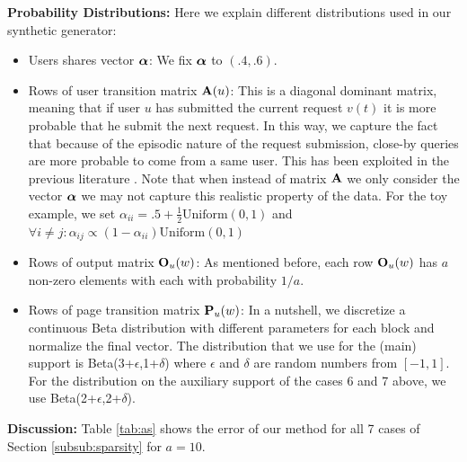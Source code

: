	{\bf Probability Distributions:}
	\label{subsub:dist}
	Here we explain different distributions used in our synthetic generator:
	\begin{itemize}
		\item {Users shares vector $\aalpha$:} We fix $\aalpha$ to $(.4, .6)$.
		
		\item {Rows of user transition matrix $\A(u)$:} This is a diagonal dominant matrix, meaning that if user $u$ has submitted the current request $v(t)$ it is more probable that he submit the next request. 
		In this way, we capture the fact that because of the episodic nature of the request submission, close-by queries are more probable to come from a same user. 
		This has been exploited in the previous literature \cite{sigcomm}. Note that when instead of matrix $\A$ we only consider the vector $\aalpha$ we may not capture this realistic property of the data.
		For the toy example, we set $\alpha_{ii} = .5 + \frac{1}{2} \text{Uniform}(0,1)$ and $\forall i \neq j: \alpha_{ij} \propto (1 - \alpha_{ii}) \text{Uniform}(0,1)$
		
		\item {Rows of output matrix $\O_u(w)$:} As mentioned before, each row $\O_u(w)$ has $a$ non-zero elements with each with probability $1/a$.
		
		\item {Rows of page transition matrix $\P_u(w)$:} In a nutshell, we discretize a continuous Beta distribution with different parameters for each block and normalize the final vector.
		The distribution that we use for the (main) support is Beta(3+$\epsilon$,1+$\delta$) where $\epsilon$ and $\delta$ are random numbers from $[-1, 1]$. 
		For the distribution on the auxiliary support of the cases 6 and 7 above, we use Beta(2+$\epsilon$,2+$\delta$).
	\end{itemize}
	
	
	
	{\bf Discussion:}
	Table \ref{tab:as} shows the error of our method for all 7 cases of Section \ref{subsub:sparsity} for $a = 10$. 
	
